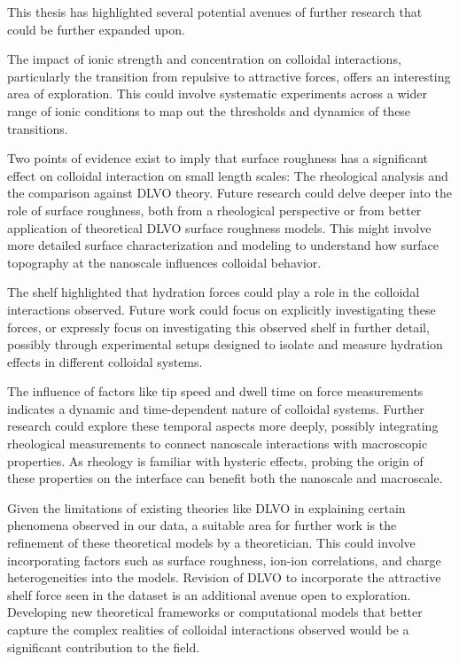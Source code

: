 This thesis has highlighted several potential avenues of further research that could be further expanded upon.

The impact of ionic strength and concentration on colloidal interactions, particularly the transition from repulsive to attractive forces, offers an interesting area of exploration. This could involve systematic experiments across a wider range of ionic conditions to map out the thresholds and dynamics of these transitions.

Two points of evidence exist to imply that surface roughness has a significant effect on colloidal interaction on small length scales: The rheological analysis and the comparison against DLVO theory. Future research could delve deeper into the role of surface roughness, both from a rheological perspective or from better application of theoretical DLVO surface roughness models. This might involve more detailed surface characterization and modeling to understand how surface topography at the nanoscale influences colloidal behavior.

The shelf highlighted that hydration forces could play a role in the colloidal interactions observed. Future work could focus on explicitly investigating these forces, or expressly focus on investigating this observed shelf in further detail, possibly through experimental setups designed to isolate and measure hydration effects in different colloidal systems.

The influence of factors like tip speed and dwell time on force measurements indicates a dynamic and time-dependent nature of colloidal systems. Further research could explore these temporal aspects more deeply, possibly integrating rheological measurements to connect nanoscale interactions with macroscopic properties. As rheology is familiar with hysteric effects, probing the origin of these properties on the interface can benefit both the nanoscale and macroscale.

Given the limitations of existing theories like DLVO in explaining certain phenomena observed in our data, a suitable area for further work is the refinement of these theoretical models by a theoretician. This could involve incorporating factors such as surface roughness, ion-ion correlations, and charge heterogeneities into the models. Revision of DLVO to incorporate the attractive shelf force seen in the dataset is an additional avenue open to exploration. Developing new theoretical frameworks or computational models that better capture the complex realities of colloidal interactions observed would be a significant contribution to the field.

